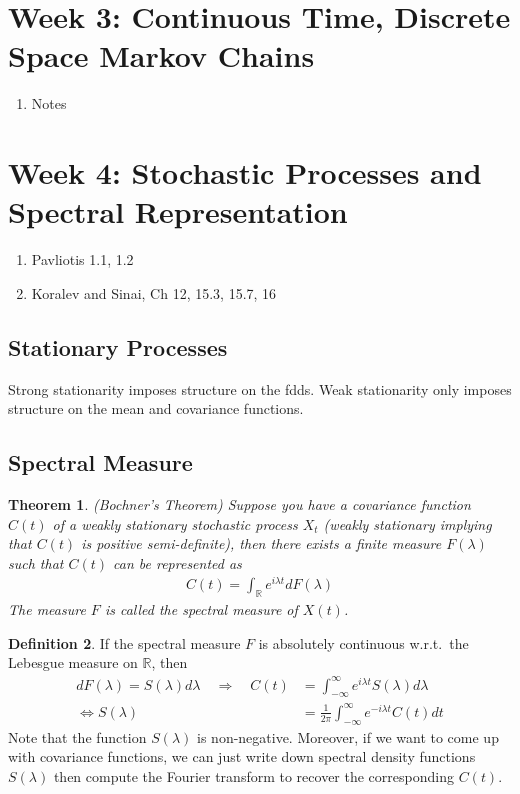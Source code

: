 \documentclass[12pt]{article}
\theoremstyle{plain}
\newtheorem{thm}{Theorem}[section]
\theoremstyle{definition}
\newtheorem{defn}[thm]{Definition}
\theoremstyle{remark}
\begin{document}
\section{Week 3: Continuous Time, Discrete Space Markov Chains}

\begin{enumerate}
  \item Notes
\end{enumerate}

\section{Week 4: Stochastic Processes and Spectral Representation}

\begin{enumerate}
  \item Pavliotis 1.1, 1.2
  \item Koralev and Sinai, Ch 12, 15.3, 15.7, 16
\end{enumerate}

\subsection{Stationary Processes}

Strong stationarity imposes structure on the fdds. Weak stationarity
only imposes structure on the mean and covariance functions.

\subsection{Spectral Measure}

\begin{thm}\emph{(Bochner's Theorem)}
Suppose you have a covariance function $C(t)$ of a weakly stationary
stochastic process $X_t$ (weakly stationary implying that $C(t)$ is
positive semi-definite), then there exists a finite measure $F(\lambda)$
such that $C(t)$ can be represented as
\begin{align*}
  C(t) = \int_\mathbb{R} e^{i\lambda t} dF(\lambda)
\end{align*}
The measure $F$ is called the \emph{spectral measure} of $X(t)$.
\end{thm}

\begin{defn}
If the spectral measure $F$ is absolutely continuous w.r.t.\ the
Lebesgue measure on $\mathbb{R}$, then
\begin{align*}
  dF(\lambda) = S(\lambda)d\lambda
  \quad \Rightarrow\quad
  C(t)
    &= \int^\infty_{-\infty} e^{i\lambda t} S(\lambda) d\lambda \\
  \Leftrightarrow
  S(\lambda)
    &= \frac{1}{2\pi} \int^\infty_{-\infty} e^{-i\lambda t} C(t) dt
\end{align*}
Note that the function $S(\lambda)$ is non-negative. Moreover, if we
want to come up with covariance functions, we can just write down
spectral density functions $S(\lambda)$ then compute the Fourier
transform to recover the corresponding $C(t)$.
\end{defn}
\end{document}
